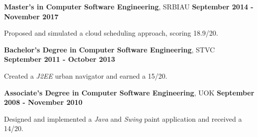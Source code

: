 \vspace*{-1pt}

\begin{scholarship}
\scholarshipentry{}
{\textbf{Master's in Computer Software Engineering}, SRBIAU \hspace{120 pt } \textbf{September 2014 - November 2017}

Proposed and simulated a cloud scheduling approach, scoring 18.9/20. \vspace{5 pt}
}
\scholarshipentry{}
				{\textbf{Bachelor's Degree in Computer Software Engineering}, STVC \hspace{100 pt } \textbf{September 2011 - October 2013}
 
				Created a \emph{J2EE} urban navigator and earned a 15/20. \vspace{5 pt}	
}		
\scholarshipentry{}
				{\textbf{Associate's Degree in Computer Software Engineering}, UOK \hspace{90 pt} \textbf{September 2008 - November 2010}
 
				Designed and implemented a \emph{Java} and \emph{Swing} paint application and received a 14/20.
}
\end{scholarship}
